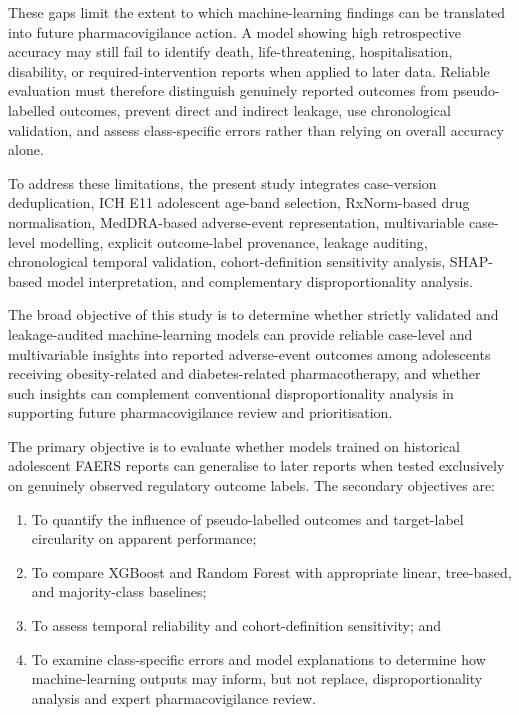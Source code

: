 \documentclass[10pt]{article}
\begin{document}
These gaps limit the extent to which machine-learning findings can be translated into future pharmacovigilance action. A model showing high retrospective accuracy may still fail to identify death, life-threatening, hospitalisation, disability, or required-intervention reports when applied to later data. Reliable evaluation must therefore distinguish genuinely reported outcomes from pseudo-labelled outcomes, prevent direct and indirect leakage, use chronological validation, and assess class-specific errors rather than relying on overall accuracy alone.

To address these limitations, the present study integrates case-version deduplication, ICH E11 adolescent age-band selection, RxNorm-based drug normalisation, MedDRA-based adverse-event representation, multivariable case-level modelling, explicit outcome-label provenance, leakage auditing, chronological temporal validation, cohort-definition sensitivity analysis, SHAP-based model interpretation, and complementary disproportionality analysis.

The broad objective of this study is to determine whether strictly validated and leakage-audited machine-learning models can provide reliable case-level and multivariable insights into reported adverse-event outcomes among adolescents receiving obesity-related and diabetes-related pharmacotherapy, and whether such insights can complement conventional disproportionality analysis in supporting future pharmacovigilance review and prioritisation.

The primary objective is to evaluate whether models trained on historical adolescent FAERS reports can generalise to later reports when tested exclusively on genuinely observed regulatory outcome labels. The secondary objectives are:
\begin{enumerate}
\item To quantify the influence of pseudo-labelled outcomes and target-label circularity on apparent performance; 
\item To compare XGBoost and Random Forest with appropriate linear, tree-based, and majority-class baselines; 
\item To assess temporal reliability and cohort-definition sensitivity; and 
\item To examine class-specific errors and model explanations to determine how machine-learning outputs may inform, but not replace, disproportionality analysis and expert pharmacovigilance review.
\end{enumerate}
\end{document}
